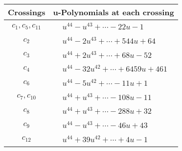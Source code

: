 \documentclass[1p]{elsarticle_modified}
\theoremstyle{definition}
\begin{document}
\begin{tabular}{m{50pt}|m{274pt}}
Crossings & \hspace{64pt}u-Polynomials at each crossing \\
\hline $$\begin{aligned}c_{1},c_{5},c_{11}\end{aligned}$$&$\begin{aligned}
&u^{44}- u^{43}+\cdots-22 u-1
\end{aligned}$\\
\hline $$\begin{aligned}c_{2}\end{aligned}$$&$\begin{aligned}
&u^{44}-2 u^{43}+\cdots+544 u+64
\end{aligned}$\\
\hline $$\begin{aligned}c_{3}\end{aligned}$$&$\begin{aligned}
&u^{44}+2 u^{43}+\cdots+68 u-52
\end{aligned}$\\
\hline $$\begin{aligned}c_{4}\end{aligned}$$&$\begin{aligned}
&u^{44}-32 u^{42}+\cdots+6459 u+461
\end{aligned}$\\
\hline $$\begin{aligned}c_{6}\end{aligned}$$&$\begin{aligned}
&u^{44}-5 u^{42}+\cdots-11 u+1
\end{aligned}$\\
\hline $$\begin{aligned}c_{7},c_{10}\end{aligned}$$&$\begin{aligned}
&u^{44}+u^{43}+\cdots-108 u-11
\end{aligned}$\\
\hline $$\begin{aligned}c_{8}\end{aligned}$$&$\begin{aligned}
&u^{44}+u^{43}+\cdots-288 u+32
\end{aligned}$\\
\hline $$\begin{aligned}c_{9}\end{aligned}$$&$\begin{aligned}
&u^{44}- u^{43}+\cdots-46 u+43
\end{aligned}$\\
\hline $$\begin{aligned}c_{12}\end{aligned}$$&$\begin{aligned}
&u^{44}+39 u^{42}+\cdots+4 u-1
\end{aligned}$\\
\hline
\end{tabular}\\~\\
\end{document}
